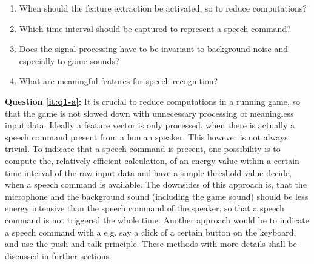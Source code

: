 \begin{enumerate}[label={Q.1.\alph*)}, leftmargin=1.75cm]
    \item When should the feature extraction be activated, so to reduce computations?
    \label{it:q1-a}
    
    \item Which time interval should be captured to represent a speech command?
    \label{it:q1-b}
    
    \item Does the signal processing have to be invariant to background noise and especially to game sounds?
    \label{it:q1-c}
    
    \item What are meaningful features for speech recognition?
    \label{it:q1-d}
    
\end{enumerate}
\noindent
\textbf{Question \ref{it:q1-a}:} 
It is crucial to reduce computations in a running game, so that the game is not slowed down with unnecessary processing of meaningless input data.
Ideally a feature vector is only processed, when there is actually a speech command present from a human speaker. 
This however is not always trivial.
To indicate that a speech command is present, one possibility is to compute the, relatively efficient calculation, of an energy value within a certain time interval of the raw input data and have a simple threshold value decide, when a speech command is available. 
The downsides of this approach is, that the microphone and the background sound (including the game sound) should be less energy intensive than the speech command of the speaker, so that a speech command is not triggered the whole time.
Another approach would be to indicate a speech command with a e.g. say a click of a certain button on the keyboard, and use the push and talk principle. 
These methods with more details shall be discussed in further sections.

